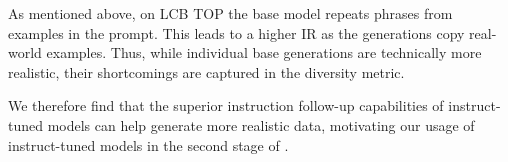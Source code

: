 As mentioned above, on LCB TOP the base model repeats phrases from examples in the prompt. This leads to a higher IR as the generations copy real-world examples. Thus, while individual base generations are technically more realistic, their shortcomings are captured in the diversity metric.

We therefore find that the superior instruction follow-up capabilities of instruct-tuned models can help generate more realistic data, motivating our usage of instruct-tuned models in the second stage of \Sys{}.
